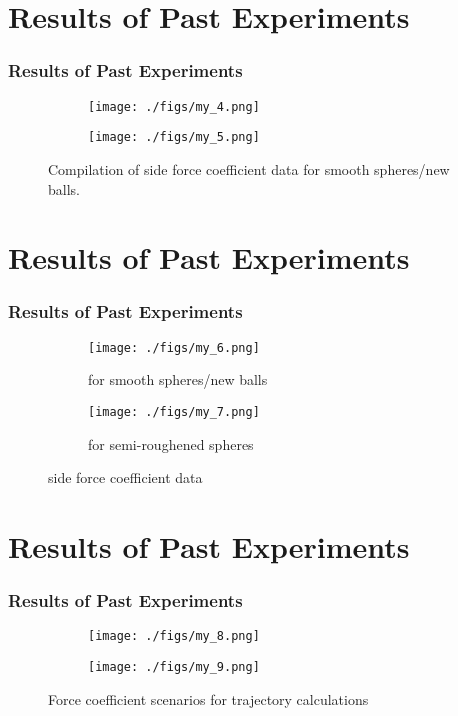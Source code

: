 \documentclass{beamer}
\begin{document}
\section{Results of Past Experiments}
\begin{frame}
\frametitle{Results of Past Experiments}

\begin{figure}[h!]
  \centering
  \begin{subfigure}[b]{0.5\linewidth}
    \texttt{[image: ./figs/my\_4.png]}
  \end{subfigure}
  \begin{subfigure}[b]{0.5\linewidth}
    \texttt{[image: ./figs/my\_5.png]}
  \end{subfigure}
  \caption{Compilation of side force coefficient data for
smooth spheres/new balls.}
  \label{fig:side1}
\end{figure}
\end{frame}

\section{Results of Past Experiments}
\begin{frame}
\frametitle{Results of Past Experiments}

\begin{figure}[h!]
  \centering
  \begin{subfigure}[b]{0.5\linewidth}
    \texttt{[image: ./figs/my\_6.png]}
    \caption{for
smooth spheres/new balls}
  \end{subfigure}
  \begin{subfigure}[b]{0.5\linewidth}
    \texttt{[image: ./figs/my\_7.png]}
    \caption{for semi-roughened spheres}
  \end{subfigure}
  \caption{side force coefficient data }
  \label{fig:side2}
\end{figure}
\end{frame}

\section{Results of Past Experiments}
\begin{frame}
\frametitle{Results of Past Experiments}

\begin{figure}[h!]
  \centering
  \begin{subfigure}[b]{0.5\linewidth}
    \texttt{[image: ./figs/my\_8.png]}
  \end{subfigure}
  \begin{subfigure}[b]{0.5\linewidth}
    \texttt{[image: ./figs/my\_9.png]}
  \end{subfigure}
  \caption{Force coefficient scenarios for trajectory calculations}
  \label{fig:side3}
\end{figure}
\end{frame}
\end{document}
